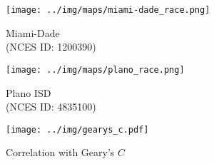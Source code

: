\documentclass{article}
\begin{document}
\begin{figure*}
\centering
\hfill
\begin{subfigure}[b]{0.45\textwidth}
    \centering
    \texttt{[image: ../img/maps/miami-dade\_race.png]}
    \caption{Miami-Dade \\ (NCES ID: 1200390)}
    \label{fig:miami-dade}
\end{subfigure}
\hfill
\begin{subfigure}[b]{0.45\textwidth}
    \centering
    \texttt{[image: ../img/maps/plano\_race.png]}
    \caption{Plano ISD \\ (NCES ID: 4835100)}
    \label{fig:plano}
\end{subfigure}
\hfill
\vfill
\begin{subfigure}[b]{\textwidth}
    \centering
    \texttt{[image: ../img/gearys\_c.pdf]}
    \caption{Correlation with Geary's $C$}
    \label{fig:gearys_c}
\end{subfigure}
\label{fig:race_maps}
\end{figure*}
\end{document}
